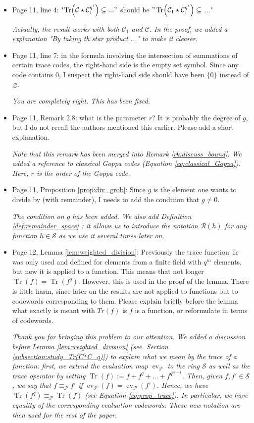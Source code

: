 \documentclass[12pt,a4paper]{amsart}
\DeclareMathOperator{\trace}{Tr}
\DeclareMathOperator{\ev}{ev}
\newcommand{\calC}{\mathcal{C}}
\newcommand{\calP}{\mathcal{P}}
\newcommand{\Tr}[1]{\trace\!\left(#1\right)}
\begin{document}
\begin{itemize}
\item Page 11, line 4: "$\Tr{\calC \star \calC_1^{q^i}} \subseteq ..."$ should be $"\Tr{\calC_1 \star \calC_1^{q^i}} \subseteq$ ..."

\textit{Actually, the result works with both $\calC_1$ and $\calC$. In the proof, we added a explanation  "By taking th star product ..." to make it clearer.} 

\item Page 11, line 7: in the formula involving the intersection of summations of certain trace codes, the right-hand side is the empty set symbol. Since any code contains 0, I suspect the right-hand side should have been $\{0\}$ instead of $\varnothing$.

\textit{You are completely right. This has been fixed.}

\item Page 11, Remark 2.8: what is the parameter $r$? It is probably the degree of $g$, but I do not recall the authors mentioned this earlier. Please add a short explanation.

\textit{Note that this remark has been merged into Remark \ref{rk:discuss_bound}. We added a reference to classical Goppa codes (Equation \eqref{eq:classical_Goppa}). Here, $r$ is the order of the Goppa code.} 

\item Page 11, Proposition \ref{prop:div_grob}: Since $g$ is the element one wants to divide by (with remainder), I needs to add the condition that $g \neq 0$.

\textit{The condition on $g$ has been added. We also add Definition \ref{def:remainder_space} : it allows us to introduce the notation $\mathcal{R}(h)$ for any function $h \in \mathcal{S}$ as we use it several times later on.} 

\item Page 12, Lemma \ref{lem:weighted_division}: Previously the trace function Tr was only used and defined for elements from a finite field with $q^m$ elements, but now it is applied to a function. This means that not longer $\Tr{f}=\Tr{f^q}$. However, this is used in the proof of the lemma. There is little harm, since later on the results are not applied to functions but to codewords corresponding to them. Please explain briefly before the lemma what exactly is meant with $Tr(f)$ is $f$ is a function, or reformulate in terms of codewords.

\textit{Thank you for bringing this problem to our attention. We added a discussion before Lemma \ref{lem:weighted_division} (see. Section \ref{subsection:study_Tr(C*C_q)}) to explain what we mean by the trace of a function: first, we extend the evaluation map $\ev_{\calP}$ to the ring $\mathcal{S}$ as well as the trace operator by setting $\Tr{f}:=f+f^q+\dots + f^{q^{m-1}}$. Then, given $f,f' \in \mathcal{S}$, we say that $f \equiv_{\calP} f'$ if $\ev_{\calP}(f)=\ev_{\calP}(f')$. Hence, we have $\Tr{f^q} \equiv_{\calP}\Tr{f}$ (see Equation \eqref{eq:prop_trace}). In particular, we have equality of the corresponding evaluation codewords. These new notation are then used for the rest of the paper.}


\end{itemize}
\end{document}
